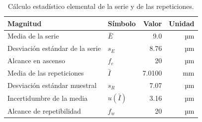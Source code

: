 \begin{table}[H]
\centering
\caption{Cálculo estadístico elemental de la serie y de las repeticiones.}
\label{tab:reloj-estadistica}
\begin{tabular}{llrr}
\toprule
Magnitud & Símbolo & Valor & Unidad \\
\midrule
Media de la serie & $\bar E$ & 9.0 & µm \\
Desviación estándar de la serie & $s_E$ & 8.76 & µm \\
Alcance en ascenso & $f_e$ & 20 & µm \\
Media de las repeticiones & $\bar I$ & 7.0100 & mm \\
Desviación estándar muestral & $s_R$ & 7.07 & µm \\
Incertidumbre de la media & $u(\bar I)$ & 3.16 & µm \\
Alcance de repetibilidad & $f_w$ & 20 & µm \\
\bottomrule
\end{tabular}
\end{table}
